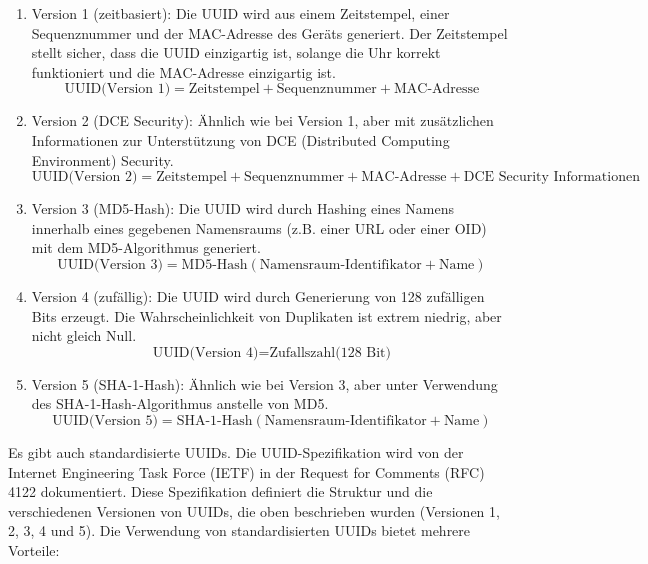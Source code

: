 \documentclass[../vs-script-first-v01.tex]{subfiles}
\begin{document}
\begin{enumerate}
    \item Version 1 (zeitbasiert): Die UUID wird aus einem Zeitstempel, einer Sequenznummer und der MAC-Adresse des Geräts generiert. Der Zeitstempel stellt sicher, dass die UUID einzigartig ist, solange die Uhr korrekt funktioniert und die MAC-Adresse einzigartig ist.
    \begin{equation}
        \text{UUID(Version 1)} = \text{Zeitstempel} + \text{Sequenznummer} + \text{MAC-Adresse}
    \end{equation}
    \item Version 2 (DCE Security): Ähnlich wie bei Version 1, aber mit zusätzlichen Informationen zur Unterstützung von DCE (Distributed Computing Environment) Security.
    \begin{equation}
        \text{UUID(Version 2)} = \text{Zeitstempel} + \text{Sequenznummer} + \text{MAC-Adresse} + \text{DCE Security Informationen}
    \end{equation}
    \item Version 3 (MD5-Hash): Die UUID wird durch Hashing eines Namens innerhalb eines gegebenen Namensraums (z.B. einer URL oder einer OID) mit dem MD5-Algorithmus generiert.
    \begin{equation}
        \text{UUID(Version 3)} = \text{MD5-Hash}(\text{Namensraum-Identifikator} + \text{Name})
    \end{equation}
    \item Version 4 (zufällig): Die UUID wird durch Generierung von 128 zufälligen Bits erzeugt. Die Wahrscheinlichkeit von Duplikaten ist extrem niedrig, aber nicht gleich Null.
    \begin{equation}
        \text{UUID(Version 4)} = \text{Zufallszahl(128 Bit)}
    \end{equation}
    \item Version 5 (SHA-1-Hash): Ähnlich wie bei Version 3, aber unter Verwendung des SHA-1-Hash-Algorithmus anstelle von MD5.
    \begin{equation}
        \text{UUID(Version 5)} = \text{SHA-1-Hash}(\text{Namensraum-Identifikator} + \text{Name})
    \end{equation}
\end{enumerate}
Es gibt auch standardisierte UUIDs. Die UUID-Spezifikation wird von der Internet Engineering Task Force (IETF) in der Request for Comments (RFC) 4122 dokumentiert. Diese Spezifikation definiert die Struktur und die verschiedenen Versionen von UUIDs, die oben beschrieben wurden (Versionen 1, 2, 3, 4 und 5). Die Verwendung von standardisierten UUIDs bietet mehrere Vorteile:
\end{document}
